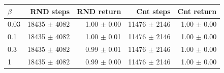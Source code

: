 \begin{tabular}{lrrrr}
\hline
$\beta$ & RND steps & RND return & Cnt steps & Cnt return \\
\hline
0.03 & 18435 $\pm$ 4082 & 1.00 $\pm$ 0.00 & 11476 $\pm$ 2146 & 1.00 $\pm$ 0.00 \\
0.1 & 18435 $\pm$ 4082 & 1.00 $\pm$ 0.01 & 11476 $\pm$ 2146 & 1.00 $\pm$ 0.00 \\
0.3 & 18435 $\pm$ 4082 & 0.99 $\pm$ 0.01 & 11476 $\pm$ 2146 & 1.00 $\pm$ 0.00 \\
1 & 18435 $\pm$ 4082 & 0.99 $\pm$ 0.00 & 11476 $\pm$ 2146 & 1.00 $\pm$ 0.00 \\
\hline
\end{tabular}
